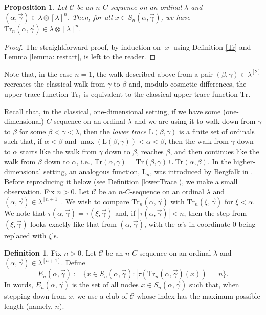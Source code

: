 \documentclass{amsart}
\numberwithin{theorem}{section}
\newtheorem{proposition}[theorem]{Proposition}
\theoremstyle{definition}
\newtheorem{definition}[theorem]{Definition}
\renewcommand{\L}{\mathrm{L}}
\newcommand{\mc}{\mathcal}
\newcommand{\C}{\mathcal{C}}
\newcommand{\Tr}{\mathrm{Tr}}
\begin{document}
\begin{proposition} \label{prop: increasing}
  Let $\mc{C}$ be an $n$-$C$-sequence on an ordinal $\lambda$ and $(\alpha,\vec{\gamma}) 
  \in \lambda \otimes [\lambda]^n$. Then, for all $x \in S_n(\alpha,\vec{\gamma})$, we have 
  $\Tr_n(\alpha,\vec{\gamma}) \in \lambda \otimes [\lambda]^n$.
\end{proposition}

\begin{proof}
  The straightforward proof, by induction on $|x|$ using Definition \ref{Tr} and 
  Lemma \ref{lemma: restart}, is left to the reader.
\end{proof}

Note that, in the case $n = 1$, the walk described above from a pair $(\beta,\gamma) \in \lambda^{[2]}$ 
recreates the classical walk from $\gamma$ to $\beta$ and, modulo cosmetic differences, the 
upper trace function $\Tr_1$ is equivalent to the classical upper trace function $\Tr$.

Recall that, in the classical, one-dimensional setting, if we have some (one-dimensional) $C$-sequence on an ordinal $\lambda$ and we are using it to walk down from $\gamma$ to $\beta$ for 
some $\beta < \gamma < \lambda$, then the \emph{lower trace} $\L(\beta,\gamma)$ is a finite set of ordinals such that, if $\alpha < \beta$ and $\max(\L(\beta,\gamma))<\alpha<\beta$, then the walk from $\gamma$ down to $\alpha$ starts like the walk from $\gamma$ down to $\beta$, reaches $\beta$, and then continues like the walk from $\beta$ down to $\alpha$, i.e., $\Tr(\alpha,\gamma) = \Tr(\beta,\gamma) \cup \Tr(\alpha,\beta)$. In the higher-dimensional setting, an analogous function, $\L_n$, was introduced by Bergfalk in \cite[Definition 7.5]{bergfalk2024introductionhigherwalks}. Before reproducing it below (see Definition \ref{lowerTrace}), we make a small observation. Fix $n>0$. Let $\C$ be an $n$-$C$-sequence on an ordinal $\lambda$ and $(\alpha,\vec{\gamma}) \in \lambda^{[n+1]}$. We wish to compare $\Tr_n(\alpha,\vec\gamma)$ with $\Tr_n(\xi,\vec\gamma)$ for $\xi<\alpha$. We note that $\tau(\alpha,\vec\gamma)=\tau(\xi,\vec\gamma)$ and, if $|\tau(\alpha,\vec{\gamma})| < n$, 
then the step from $(\xi,\vec\gamma)$ looks exactly like that from $(\alpha,\vec\gamma)$, with the $\alpha$'s in coordinate $0$ being replaced with $\xi$'s.

\begin{definition}\label{extreme}
Fix $n>0$. Let $\C$ be an $n$-$C$-sequence on an ordinal $\lambda$ 
and $(\alpha,\vec{\gamma}) \in \lambda^{[n+1]}$. Define
\[
E_n(\alpha,\vec\gamma):=\{x\in S_n(\alpha,\vec\gamma):|\tau(\Tr_n(\alpha,\vec\gamma)(x))|=n\}.
\]
In words, $E_n(\alpha,\vec\gamma)$ is the set of all nodes $x\in S_n(\alpha,\vec\gamma)$ such that, when stepping down from $x$, we use a club of $\C$ whose index has the maximum possible length (namely, $n$).
\end{definition}
\end{document}
